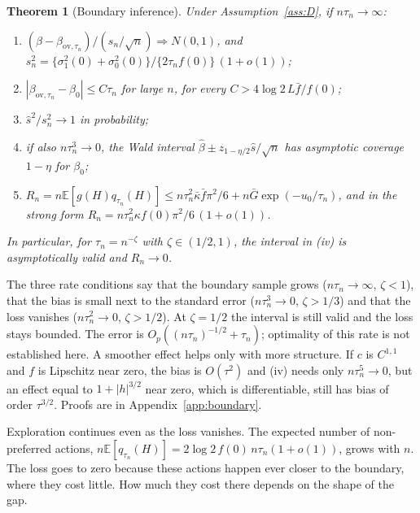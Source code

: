 \documentclass[12pt]{article}
\newtheorem{theorem}{Theorem}
\theoremstyle{definition}
\theoremstyle{remark}
\newcommand{\E}{\mathbb{E}}
\newcommand{\ov}{\mathrm{ov}}
\begin{document}
\begin{theorem}[Boundary inference]\label{thm:boundary}
Under Assumption~\ref{ass:D}, if $n\tau_n\to\infty$:
\begin{enumerate}[label=(\roman*),leftmargin=2em,itemsep=1pt]
\item $(\hat\beta-\beta_{\ov,\tau_n})/(s_n/\sqrt n)\Rightarrow N(0,1)$, and
$s_n^2=\{\sigma_1^2(0)+\sigma_0^2(0)\}/\{2\tau_nf(0)\}\,(1+o(1))$;
\item $|\beta_{\ov,\tau_n}-\beta_0|\le C\tau_n$ for large $n$, for every
$C>4\log2\,L\bar f/f(0)$;
\item $\hat s^2/s_n^2\to1$ in probability;
\item if also $n\tau_n^3\to0$, the Wald interval $\hat\beta\pm
z_{1-\eta/2}\hat s/\sqrt n$ has asymptotic coverage $1-\eta$ for $\beta_0$;
\item $R_n=n\E[g(H)q_{\tau_n}(H)]\le n\tau_n^2\bar\kappa\bar f\pi^2/6+n\bar G\exp(-u_0/\tau_n)$, and in
the strong form $R_n=n\tau_n^2\kappa f(0)\pi^2/6\,(1+o(1))$.
\end{enumerate}
In particular, for $\tau_n=n^{-\zeta}$ with $\zeta\in(1/2,1)$, the interval in
(iv) is asymptotically valid and $R_n\to0$.
\end{theorem}

The three rate conditions say that the boundary sample grows ($n\tau_n\to\infty$,
$\zeta<1$), that the bias is small next to the standard error ($n\tau_n^3\to0$,
$\zeta>1/3$) and that the loss vanishes ($n\tau_n^2\to0$, $\zeta>1/2$). At
$\zeta=1/2$ the interval is still valid and the loss stays bounded. The error is
$O_p((n\tau_n)^{-1/2}+\tau_n)$; optimality of this rate is not established here.
A smoother effect helps only with more structure. If $c$ is $C^{1,1}$ and $f$ is
Lipschitz near zero, the bias is $O(\tau^2)$ and (iv) needs only $n\tau_n^5\to0$, but
an effect equal to $1+|h|^{3/2}$ near zero, which is differentiable, still has bias
of order $\tau^{3/2}$. Proofs are in Appendix~\ref{app:boundary}.

Exploration continues even as the loss vanishes. The expected number of non-preferred
actions, $n\E[q_{\tau_n}(H)]=2\log2\,f(0)\,n\tau_n(1+o(1))$, grows with $n$. The loss
goes to zero because these actions happen ever closer to the boundary, where they
cost little. How much they cost there depends on the shape of the gap.
\end{document}
